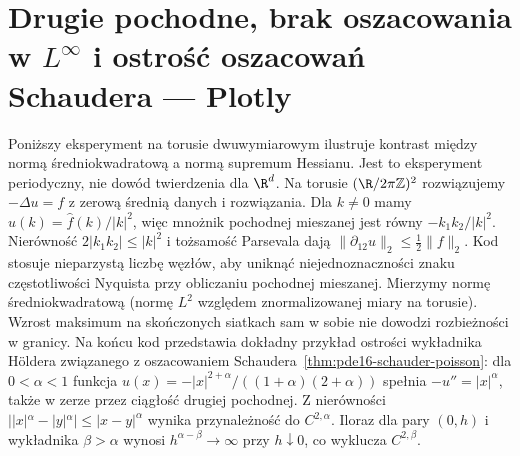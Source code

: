 \section[Drugie pochodne i ostrość oszacowań Schaudera — Plotly]{Drugie pochodne, brak oszacowania w $L^\infty$ i ostrość oszacowań Schaudera — Plotly}
Poniższy eksperyment na torusie dwuwymiarowym ilustruje kontrast
między normą średniokwadratową a normą supremum Hessianu.
Jest to eksperyment periodyczny, nie dowód twierdzenia dla $\R^d$.
Na torusie $(\R/2\pi\mathbb Z)^2$ rozwiązujemy
$-\Delta u=f$ z zerową średnią danych i rozwiązania.
Dla $k\ne0$ mamy $\widehat u(k)=\widehat f(k)/|k|^2$,
więc mnożnik pochodnej mieszanej jest równy
$-k_1k_2/|k|^2$. Nierówność $2|k_1k_2|\le|k|^2$
i tożsamość Parsevala dają
$\|\partial_{12}u\|_2\le\frac12\|f\|_2$.
Kod stosuje nieparzystą liczbę węzłów, aby uniknąć
niejednoznaczności znaku częstotliwości Nyquista
przy obliczaniu pochodnej mieszanej.
Mierzymy normę średniokwadratową (normę $L^2$
względem znormalizowanej miary na torusie).
Wzrost maksimum na skończonych siatkach sam
w sobie nie dowodzi rozbieżności w granicy.
Na końcu kod przedstawia dokładny przykład ostrości
wykładnika Höldera związanego z oszacowaniem
Schaudera~\ref{thm:pde16-schauder-poisson}:
dla $0<\alpha<1$ funkcja
$u(x)=-|x|^{2+\alpha}/((1+\alpha)(2+\alpha))$
spełnia $-u''=|x|^\alpha$, także w zerze przez
ciągłość drugiej pochodnej.
Z nierówności $||x|^\alpha-|y|^\alpha|\le|x-y|^\alpha$
wynika przynależność do $C^{2,\alpha}$.
Iloraz dla pary $(0,h)$ i wykładnika $\beta>\alpha$
wynosi $h^{\alpha-\beta}\to\infty$ przy $h\downarrow0$,
co wyklucza $C^{2,\beta}$.
